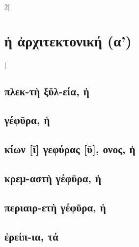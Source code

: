 \documentclass{book}
\begin{document}
\begin{multicols}{2}[\section{ἡ ἀρχιτεκτονική (α')}]
\subsection{πλεκ-τὴ ξῠλ-εία, ἡ}
\subsection{γέφῡρα, ἡ}
\subsection{κίων [ῑ] γεφύρας [ῡ], ονος, ἡ}
\subsection{κρεμ-αστὴ γέφῡρα, ἡ}
\subsection{περιαιρ-ετὴ γέφῡρα, ἡ}
\subsection{ἐρείπ-ια, τά}
~
\end{multicols}
\newpage  
\end{document}

